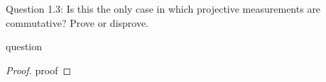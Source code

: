 \begin{solution}{Question 1.3: Is this the only case in which projective measurements are commutative? Prove or disprove.}\label{ques:x}
    \begin{question}
    question
    \end{question}
    \tcblower{}
    \begin{proof}
    proof
    \end{proof}
\end{solution}
